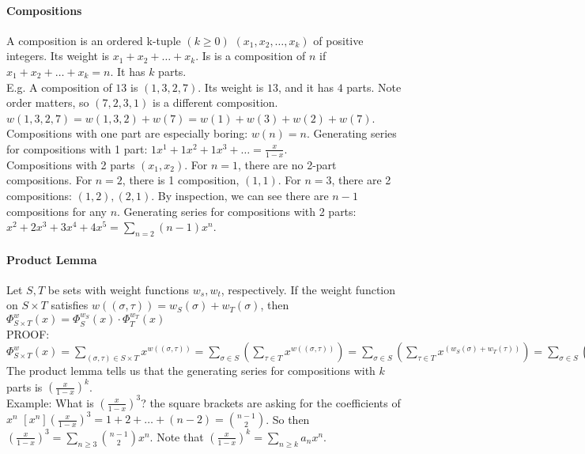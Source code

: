 \documentclass[10pt,letter]{article}
\begin{document}
\paragraph{Compositions}
A composition is an ordered k-tuple $(k\geq 0)$ $(x_1,x_2,\ldots,x_k)$ of positive integers. Its weight is $x_1+x_2+\ldots+x_k$. Is is a composition of $n$ if $x_1+x_2+\ldots+x_k=n$. It has $k$ parts. \\ 
E.g. A composition of $13$ is $(1,3,2,7)$. Its weight is $13$, and it has $4$ parts. Note order matters, so $(7,2,3,1)$ is a different composition. $w(1,3,2,7)=w(1,3,2)+w(7)=w(1)+w(3)+w(2)+w(7)$. \\ 
Compositions with one part are especially boring: $w(n)=n$. Generating series for compositions with 1 part: $1x^1+1x^2+1x^3+\ldots=\frac{x}{1-x}$. \\ 
Compositions with 2 parts $(x_1,x_2)$. For $n=1$, there are no 2-part compositions. For $n=2$, there is 1 composition, $(1,1)$. For $n=3$, there are 2 compositions: $(1,2), (2,1)$. By inspection, we can see there are $n-1$ compositions for any $n$. Generating series for compositions with 2 parts: $x^2+2x^3+3x^4+4x^5=\sum_{n=2}(n-1)x^n$. 

\paragraph{Product Lemma}
Let $S,T$ be sets with weight functions $w_s,w_t$, respectively. If the weight function on $S\times T$ satisfies $w((\sigma,\tau))=w_S(\sigma)+w_T(\sigma)$, then $\Phi_{S\times T}^w(x)=\Phi_S^{w_S}(x)\cdot\Phi_T^{w_T}(x)$\\ 
PROOF: $\Phi_{S\times T}^w(x)=\sum_{(\sigma,\tau)\in S\times T}x^{w((\sigma,\tau))}=\sum_{\sigma\in S}\left(\sum_{\tau\in T}x^{w((\sigma,\tau))}\right)=\sum_{\sigma\in S}\left(\sum_{\tau\in T}x^{(w_S(\sigma)+w_T(\tau))}\right)=\sum_{\sigma\in S}\left(\sum_{\tau\in T}x^{w_s(\sigma)}x^{w_T(\tau)}\right)=\sum_{\sigma\in S}\left(x^{w_S(\sigma)}\sum_{\tau\in T}x^{w_T(\tau)}\right)=\left(\sum_{\tau\in T}x^{w_T(\tau)}\right)\left(\sum_{\sigma\in S}x^{w_S(\sigma}\right)=\Phi_T^{w_T}(x)\cdot\Phi_S^{w_S}(x)$ \\ 
The product lemma tells us that the generating series for compositions with $k$ parts is $(\frac{x}{1-x})^k$. \\ 
Example: What is $(\frac{x}{1-x})^3$? the square brackets are asking for the coefficients of $x^n$ $[x^n]\left(\frac{x}{1-x}\right)^3=1+2+\ldots+(n-2)={n-1\choose 2}$. So then $\left(\frac{x}{1-x}\right)^3=\sum_{n\geq3}{n-1\choose2}x^n$. Note that $\left(\frac{x}{1-x}\right)^k=\sum_{n\geq k}a_nx^n$. 
\end{document}
